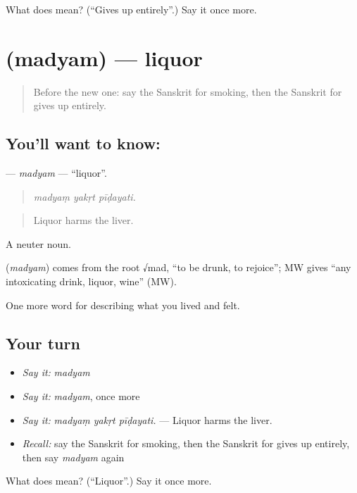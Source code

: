 \begin{tcolorbox}[breakable,colback=teal!4,colframe=teal!35!black,title={Before you move on}]
What does  mean? (\textquotedblleft{}Gives up entirely\textquotedblright{}.) Say it once more.
\end{tcolorbox}
\section[\texorpdfstring{\sk{मद्यम्} (madyam)}{मद्यम् (madyam)}]{ (madyam) — liquor}

\label{lesson:SA-C489-madyam}



\begin{quote}
Before the new one: say the Sanskrit for smoking, then the Sanskrit for gives up entirely.
\end{quote}

\subsection*{You'll want to know: }
\textbf{} — \emph{madyam} — \textquotedblleft{}liquor\textquotedblright{}.

\begin{quote}
  
\end{quote}

\begin{quote}
\emph{madyaṃ yakṛt pīḍayati.}
\end{quote}

\begin{quote}
Liquor harms the liver.
\end{quote}

A neuter noun.

\begin{cousinweb}
\textbf{} (\emph{madyam}) comes from the root √mad, \textquotedblleft{}to be drunk, to rejoice\textquotedblright{}; MW gives \textquotedblleft{}any intoxicating drink, liquor, wine\textquotedblright{} (MW).
\end{cousinweb}

\begin{grammarlens}[title={What you've built}]
One more word for describing what you lived and felt.
\end{grammarlens}

\subsection*{Your turn}
\begin{itemize}
\raggedright
  \item \emph{Say it:} \emph{madyam}
  \item \emph{Say it:} \emph{madyam}, once more
  \item \emph{Say it:} \emph{madyaṃ yakṛt pīḍayati.} — Liquor harms the liver.
  \item \emph{Recall:} say the Sanskrit for smoking, then the Sanskrit for gives up entirely, then say \emph{madyam} again
\end{itemize}

\begin{tcolorbox}[breakable,colback=teal!4,colframe=teal!35!black,title={Before you move on}]
What does  mean? (\textquotedblleft{}Liquor\textquotedblright{}.) Say it once more.
\end{tcolorbox}
